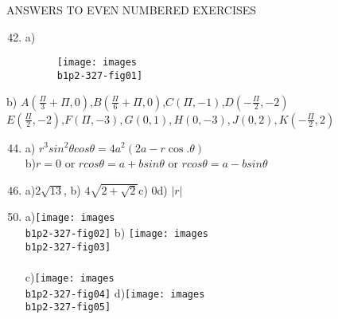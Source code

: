 \documentclass[11pt]{amsbook}
\begin{document}

    
      \hspace{3 cm}  ANSWERS TO EVEN  NUMBERED EXERCISES \\ 
     

 
    \begin{enumerate}
        \setcounter{enumi}{41}
        \item a) 
           
           \begin{figure}[htbp]
                
                \texttt{[image: images\\b1p2-327-fig01]}
                \centering
            \end{figure}
        
    \end{enumerate}    
        \par
        \quad\quad b) $A({\frac{\Pi}{3}}+\Pi,0)$,\quad$B({\frac{\Pi}{6}}+\Pi,0)$,\quad$C(\Pi,-1)$,\quad$D({-\frac{\Pi}{2}},-2)$\\
         
         \quad\quad$E({\frac{\Pi}{2}},-2)$,$F(\Pi,-3), G(0,1),H(0,-3),  J(0,2),K({-\frac{\Pi}{2}},2)$
        \par
        
    \begin{enumerate}
        \setcounter{enumi}{43}
        \item a) $r^3 sin^2 \theta cos\theta = 4a^2(2a-r \cos  . \theta)$ \\
        b)\quad$r=0$ \quad or $r cos\theta=a + b sin\theta$ or $r cos\theta =a-b sin\theta$
    \end{enumerate}   
    
    \begin{enumerate}
        \setcounter{enumi}{45}
        \item a)$2\sqrt{13}$, \qquad b) $4\sqrt{2+{\sqrt{2}}}$\qquad c) 0\qquad d) $\left|r\right|$
    \end{enumerate}
    
    \begin{enumerate}
       \setcounter{enumi}{49}
       \item a)\texttt{[image: images\\b1p2-327-fig02]} b) \texttt{[image: images\\b1p2-327-fig03]}\\\\
       c)\texttt{[image: images\\b1p2-327-fig04]}\hspace{11 pt}  
       d)\texttt{[image: images\\b1p2-327-fig05]}
     \end{enumerate}
    
\end{document}

